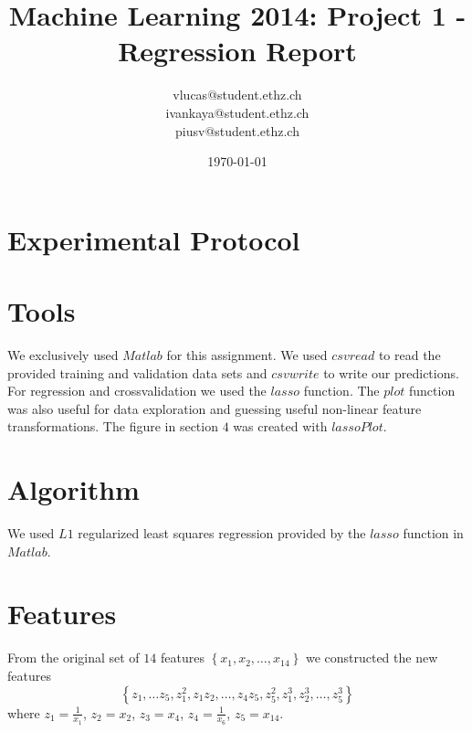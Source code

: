 \documentclass[a4paper, 11pt]{article}
\title{Machine Learning 2014: Project 1 - Regression Report}
\author{vlucas@student.ethz.ch\\ ivankaya@student.ethz.ch\\ piusv@student.ethz.ch\\}
\date{\today}
\begin{document}
\maketitle

\section*{Experimental Protocol}

\section{Tools}

We exclusively used $Matlab$ for this assignment.
We used $csvread$ to read the provided training and validation data sets and
$csvwrite$ to write our predictions. For regression and crossvalidation we used
the $lasso$ function. The $plot$ function was also useful for data exploration
and guessing useful non-linear feature transformations. The figure in section $4$
was created with $lassoPlot$.


\section{Algorithm}
We used $L1$ regularized least squares regression provided by the $lasso$ function in $Matlab$.

\section{Features}

From the original set of $14$ features $\left\{x_1, x_2, \ldots, x_{14} \right\}$
we constructed the new features
\[
\left\{z_1, \ldots z_5, z_{1}^{2}, z_1z_2, \ldots, z_4z_5, z_{5}^{2}, z_{1}^{3}, z_{2}^{3}, \ldots, z_{5}^{3} \right\}
\]
where $z_1 = \frac{1}{x_1}$, $z_2 = x_2$, $z_3 = x_4$, $z_4 = \frac{1}{x_6}$, $z_5 = x_{14}$.
\end{document}
